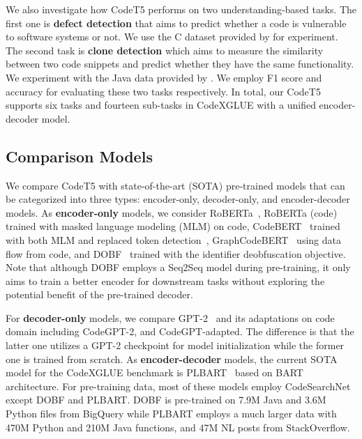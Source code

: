 \documentclass[11pt]{article}
\begin{document}
We also investigate how CodeT5 performs  on  two understanding-based tasks. 
The first one is \textbf{defect detection} that aims to predict whether a code is vulnerable to software systems or not. We use the C dataset provided by \citet{DBLP:conf/nips/ZhouLSD019} for experiment.
The second task is \textbf{clone detection} which aims to measure the similarity between two code snippets and predict whether they have the same functionality. We experiment with the Java data provided by \citet{DBLP:conf/wcre/WangLM0J20}. We employ F1 score and accuracy for evaluating these two tasks respectively. 
In total, our CodeT5 supports six tasks and fourteen sub-tasks in CodeXGLUE with a unified encoder-decoder model.


\subsection{Comparison Models}
We compare CodeT5 with state-of-the-art (SOTA) pre-trained models that can be categorized into three types:  encoder-only, decoder-only, and encoder-decoder models.
As \textbf{encoder-only} models, we consider RoBERTa~\cite{DBLP:journals/corr/abs-1907-11692}, RoBERTa (code) trained with masked language modeling (MLM) on code, CodeBERT~\cite{DBLP:conf/emnlp/FengGTDFGS0LJZ20} trained with both MLM and replaced token detection~\cite{DBLP:conf/iclr/ClarkLLM20},  GraphCodeBERT~\cite{DBLP:journals/corr/abs-2009-08366} using data flow from code, and DOBF~\cite{DBLP:journals/corr/abs-2102-07492} trained with the identifier deobfuscation objective. Note that although DOBF employs a Seq2Seq model during pre-training, it only aims to train a better encoder for downstream tasks without exploring the potential benefit of the pre-trained decoder. 

For \textbf{decoder-only} models, we compare GPT-2~\cite{radford2019language} and its adaptations on code domain including CodeGPT-2, and CodeGPT-adapted. The difference is that the latter one utilizes a GPT-2 checkpoint for model initialization while the former one is trained from scratch. As \textbf{encoder-decoder} models, the current SOTA model for the CodeXGLUE benchmark is PLBART~\cite{DBLP:journals/corr/abs-2103-06333} based on BART~\cite{DBLP:conf/acl/LewisLGGMLSZ20} architecture.
For pre-training data, most of these models employ CodeSearchNet~\cite{DBLP:journals/corr/abs-1909-09436} except  DOBF and PLBART.
DOBF is pre-trained on  7.9M Java and 3.6M Python files from BigQuery while PLBART employs a much larger data   with 470M Python and 210M Java functions, and  47M NL posts from StackOverflow.
\end{document}
